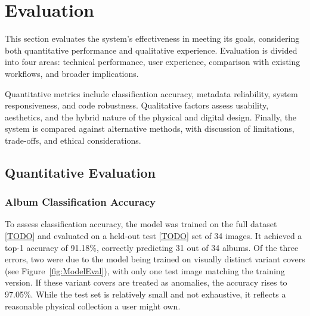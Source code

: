     
    \section{Evaluation} \label{sec:evaluation}
    
        This section evaluates the system’s effectiveness in meeting its goals, considering both quantitative performance and qualitative experience. Evaluation is divided into four areas: technical performance, user experience, comparison with existing workflows, and broader implications.
    
        Quantitative metrics include classification accuracy, metadata reliability, system responsiveness, and code robustness. Qualitative factors assess usability, aesthetics, and the hybrid nature of the physical and digital design. Finally, the system is compared against alternative methods, with discussion of limitations, trade-offs, and ethical considerations.
        
        \subsection{Quantitative Evaluation}
    
            \subsubsection{Album Classification Accuracy}
    
                To assess classification accuracy, the model was trained on the full dataset \ref{TODO} and evaluated on a held-out test \ref{TODO} set of 34 images. It achieved a top-1 accuracy of 91.18\%, correctly predicting 31 out of 34 albums. Of the three errors, two were due to the model being trained on visually distinct variant covers (see Figure~\ref{fig:ModelEval}), with only one test image matching the training version. If these variant covers are treated as anomalies, the accuracy rises to 97.05\%. While the test set is relatively small and not exhaustive, it reflects a reasonable physical collection a user might own.
    
